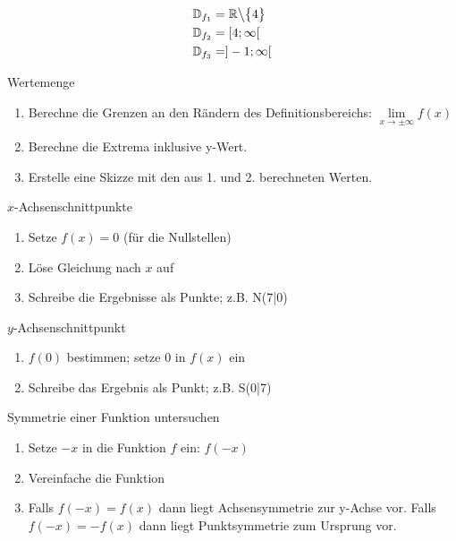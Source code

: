 \documentclass[paper=a6,landscape,ngerman,twoside=true,fontsize=12pt]{scrartcl}
\begin{document}
\begin{antwort}
	\begin{align*}
	   	  \mathbb{D}_{f_1}&=\mathbb{R}\big\backslash\big\{4\big\} \\
		  \mathbb{D}_{f_2}&=[4;\infty[ \\
		  \mathbb{D}_{f_3}&=]-1;\infty[ \\
	\end{align*}
\end{antwort}
\begin{frage}
	Wertemenge
\end{frage}
\begin{antwort}
	\begin{enumerate}
		\item Berechne die Grenzen an den Rändern des Definitionsbereichs: $\lim\limits_{x \rightarrow\pm\infty}{f(x)}$
		\item Berechne die Extrema inklusive y-Wert.
		\item Erstelle eine Skizze mit den aus 1. und 2. berechneten Werten.
	\end{enumerate}
\end{antwort}
\begin{frage}
	$x$-Achsenschnittpunkte
\end{frage}
\begin{antwort}
	\begin{enumerate}
		\item Setze $f(x)=0$ (für die Nullstellen)
		\item Löse Gleichung nach $x$ auf
		\item Schreibe die Ergebnisse als Punkte; z.B. N(7|0)
	\end{enumerate}
\end{antwort}
\begin{frage}
	$y$-Achsenschnittpunkt
\end{frage}
\begin{antwort}
	\begin{enumerate}
		\item $f(0)$ bestimmen; setze $0$ in $f(x)$ ein
		\item Schreibe das Ergebnis als Punkt; z.B. S(0|7)
	\end{enumerate}
\end{antwort}
\begin{frage}
	Symmetrie einer Funktion untersuchen
\end{frage}
\begin{antwort}
	\begin{enumerate}
		\item Setze $-x$ in die Funktion $f$ ein: $f(-x)$
		\item Vereinfache die Funktion
		\item Falls $f(-x)=f(x)$ dann liegt Achsensymmetrie zur y-Achse vor. Falls $f(-x)=-f(x)$ dann liegt Punktsymmetrie zum Ursprung vor.
	\end{enumerate}
\end{antwort}
\end{document}
